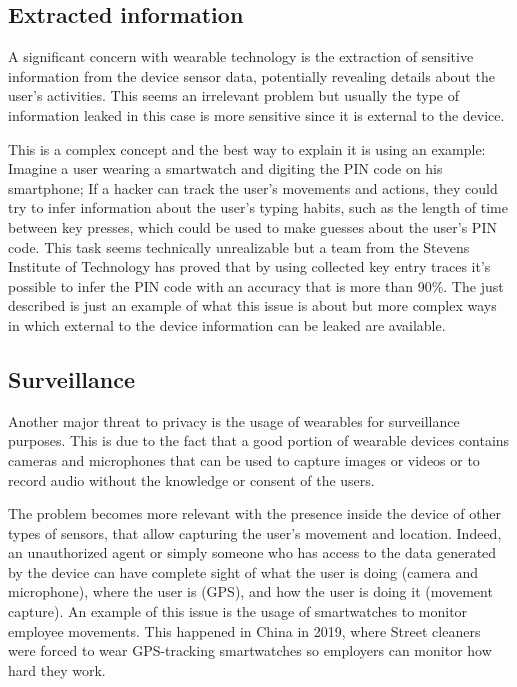 \documentclass{article}
\begin{document}
\subsection{Extracted information}
A significant concern with wearable technology is the extraction of sensitive information from the device sensor data, potentially revealing details about the user's activities. This seems an irrelevant problem but usually the type of information leaked in this case is more sensitive since it is external to the device. 

This is a complex concept and the best way to explain it is using an example: Imagine a user wearing a smartwatch and digiting the PIN code on his smartphone; If a hacker can track the user's movements and actions, they could try to infer information about the user's typing habits, such as the length of time between key presses, which could be used to make guesses about the user's PIN code. This task seems technically unrealizable but a team from  the Stevens Institute of Technology has proved that by using collected key entry traces it’s possible to infer the PIN code with an accuracy that is more than 90\%.\cite{wang_friend_2016} The just described is just an example of what this issue is about but more complex ways in which external to the device information can be leaked are available. 

\subsection{Surveillance}
Another major threat to privacy is the usage of wearables for surveillance purposes. This is due to the fact that a good portion of wearable devices contains cameras and microphones that can be used to capture images or videos or to record audio without the knowledge or consent of the users.

The problem becomes more relevant with the presence inside the device of other types of sensors, that allow capturing the user's movement and location. Indeed, an unauthorized agent or simply someone who has access to the data generated by the device can have complete sight of what the user is doing (camera and microphone), where the user is (GPS), and how the user is doing it (movement capture). An example of this issue is the usage of smartwatches to monitor employee movements. This happened in China in 2019, where Street cleaners were forced to wear GPS-tracking smartwatches so employers can monitor how hard they work.\cite{noauthor_work_2019}
\end{document}

